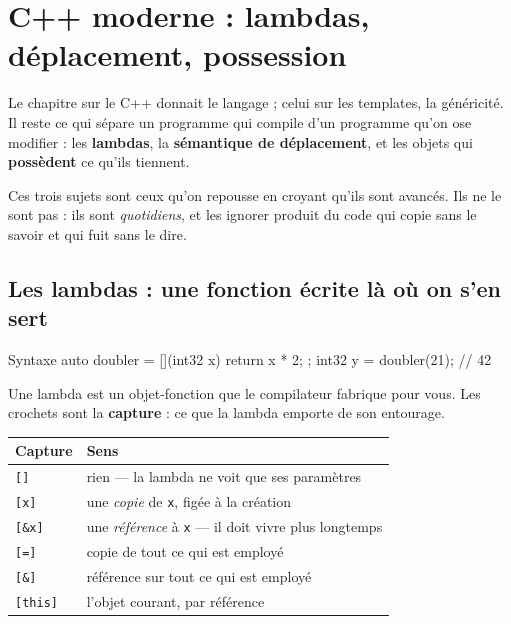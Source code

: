 \chapter{C++ moderne : lambdas, déplacement, possession}

Le chapitre sur le C++ donnait le langage ; celui sur les templates, la
généricité. Il reste ce qui sépare un programme qui compile d'un programme qu'on
ose modifier : les \textbf{lambdas}, la \textbf{sémantique de déplacement}, et
les objets qui \textbf{possèdent} ce qu'ils tiennent.

Ces trois sujets sont ceux qu'on repousse en croyant qu'ils sont avancés. Ils ne
le sont pas : ils sont \emph{quotidiens}, et les ignorer produit du code qui
copie sans le savoir et qui fuit sans le dire.

\section{Les lambdas : une fonction écrite là où on s'en sert}

\begin{nkcode}{Syntaxe}
auto doubler = [](int32 x) { return x * 2; };
int32 y = doubler(21);                        // 42
\end{nkcode}

Une lambda est un objet-fonction que le compilateur fabrique pour vous. Les
crochets sont la \textbf{capture} : ce que la lambda emporte de son entourage.

\begin{center}
\begin{tabular}{@{}ll@{}}
\toprule
\textbf{Capture} & \textbf{Sens} \\
\midrule
\texttt{[]} & rien --- la lambda ne voit que ses paramètres \\
\texttt{[x]} & une \emph{copie} de \texttt{x}, figée à la création \\
\texttt{[\&x]} & une \emph{référence} à \texttt{x} --- il doit vivre plus longtemps \\
\texttt{[=]} & copie de tout ce qui est employé \\
\texttt{[\&]} & référence sur tout ce qui est employé \\
\texttt{[this]} & l'objet courant, par référence \\
\bottomrule
\end{tabular}
\end{center}


